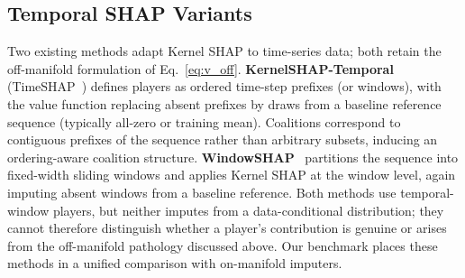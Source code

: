 \subsection{Temporal SHAP Variants}
\label{sec:temporal-shap}

Two existing methods adapt Kernel SHAP to time-series data; both retain
the off-manifold formulation of Eq.~\eqref{eq:v_off}.
\textbf{KernelSHAP-Temporal} (TimeSHAP~\citep{bento2021timeshap})
defines players as ordered time-step prefixes (or windows), with the
value function replacing absent prefixes by draws from a baseline reference
sequence (typically all-zero or training mean).  Coalitions correspond to
contiguous prefixes of the sequence rather than arbitrary subsets,
inducing an ordering-aware coalition structure.
\textbf{WindowSHAP}~\citep{nayebi2023windowshap} partitions the sequence into
fixed-width sliding windows and applies Kernel SHAP at the window level,
again imputing absent windows from a baseline reference.
Both methods use temporal-window players, but neither imputes from a
data-conditional distribution; they cannot therefore distinguish whether
a player's contribution is genuine or arises from the off-manifold pathology
discussed above.  Our benchmark places these methods in a unified comparison
with on-manifold imputers.
